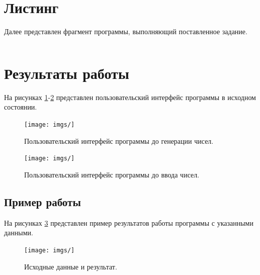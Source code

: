 \documentclass[14pt]{extreport}
\begin{document}
\section{Листинг}

Далее представлен фрагмент программы, выполняющий поставленное задание.

\begin{lstlisting}

\end{lstlisting}

\section{Результаты работы}

На рисунках \ref{img:ui1}-\ref{img:ui2} представлен пользовательский интерфейс программы в исходном состоянии.

\begin{figure}[H]
	\begin{center}
		\texttt{[image: imgs/]}
	\end{center}
	\caption{Пользовательский интерфейс программы до генерации чисел.}
	\label{img:ui1}
\end{figure}

\begin{figure}[H]
	\begin{center}
		\texttt{[image: imgs/]}
	\end{center}
	\caption{Пользовательский интерфейс программы до ввода чисел.}
	\label{img:ui2}
\end{figure}

\subsection{Пример работы}

На рисунках \ref{img:res} представлен пример результатов работы программы с указанными данными.

\begin{figure}[H]
	\begin{center}
		\texttt{[image: imgs/]}
	\end{center}
	\caption{Исходные данные и результат.}
	\label{img:res}
\end{figure}
\end{document}
